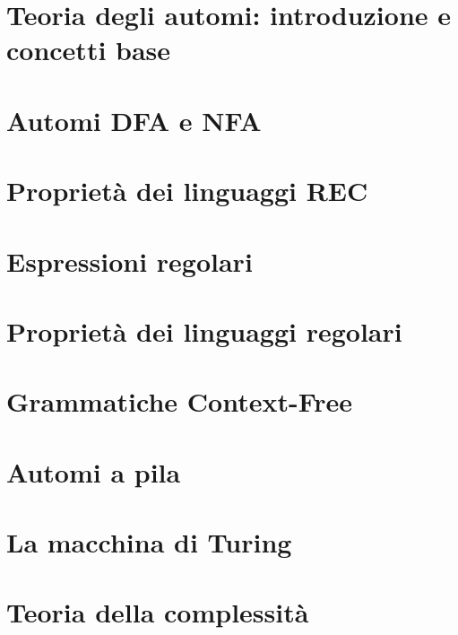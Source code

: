 \documentclass[12pt]{article}
\begin{document}


\tableofcontents
\restoregeometry

\section{Teoria degli automi: introduzione e concetti base}


\section{Automi DFA e NFA}


\section{Proprietà dei linguaggi REC}


\section{Espressioni regolari}


\section{Proprietà dei linguaggi regolari}


\section{Grammatiche Context-Free}


\section{Automi a pila}


\section{La macchina di Turing}


\section{Teoria della complessità}

\end{document}
